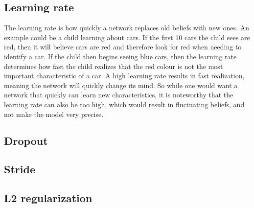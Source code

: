 \subsection{Learning rate}
The learning rate is how quickly a network replaces old beliefs with new ones. An example could be a child learning about cars. If the first 10 cars the child sees are red, then it will believe cars are red and therefore look for red when needing to identify a car. If the child then begins seeing blue cars, then the learning rate determines how fast the child realizes that the red colour is not the most important characteristic of a car. A high learning rate results in fast realization, meaning the network will quickly change its mind. So while one would want a network that quickly can learn new characteristics, it is noteworthy that the learning rate can also be too high, which would result in fluctuating beliefs, and not make the model very precise. 

\subsection{Dropout}


\subsection{Stride}

\subsection{L2 regularization}

